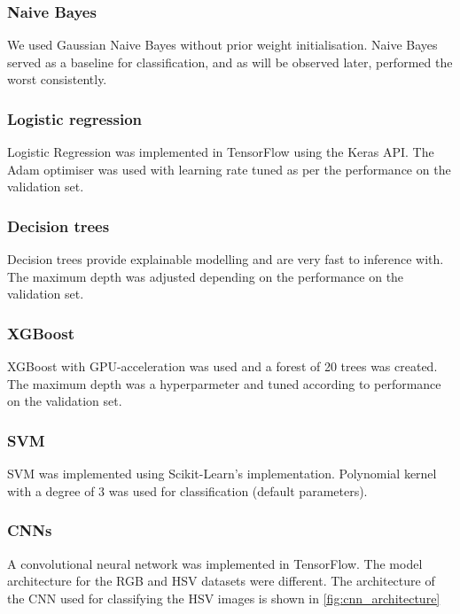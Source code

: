 \documentclass[10pt,twocolumn,letterpaper]{article}
\begin{document}
\subsubsection{Naive Bayes}
We used Gaussian Naive Bayes without prior weight initialisation. Naive Bayes served as a baseline for classification, and as will be observed later, performed the worst consistently.

\subsubsection{Logistic regression}
Logistic Regression was implemented in TensorFlow using the Keras API. The Adam optimiser was used with learning rate tuned as per the performance on the validation set. 

\subsubsection{Decision trees}
Decision trees provide explainable modelling and are very fast to inference with. The maximum depth was adjusted depending on the performance on the validation set.

\subsubsection{XGBoost}
XGBoost with GPU-acceleration was used and a forest of 20 trees was created. The maximum depth was a hyperparmeter and tuned according to performance on the validation set.

\subsubsection{SVM}
SVM was implemented using Scikit-Learn's implementation. Polynomial kernel with a degree of 3 was used for classification (default parameters).

\subsubsection{CNNs}
A convolutional neural network was implemented in TensorFlow. The model architecture for the RGB and HSV datasets were different. The architecture of the CNN used for classifying the HSV images is shown in \ref{fig:cnn_architecture}
\end{document}
